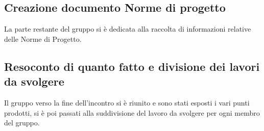 \subsection{Creazione documento Norme di progetto}
La parte restante del gruppo si è dedicata alla raccolta di informazioni relative delle Norme di Progetto.

\subsection{Resoconto di quanto fatto e divisione dei lavori da svolgere}
Il gruppo verso la fine dell'incontro si è riunito e sono stati esposti i vari punti prodotti, si è poi passati alla suddivisione del lavoro da svolgere per ogni membro del gruppo.
\clearpage